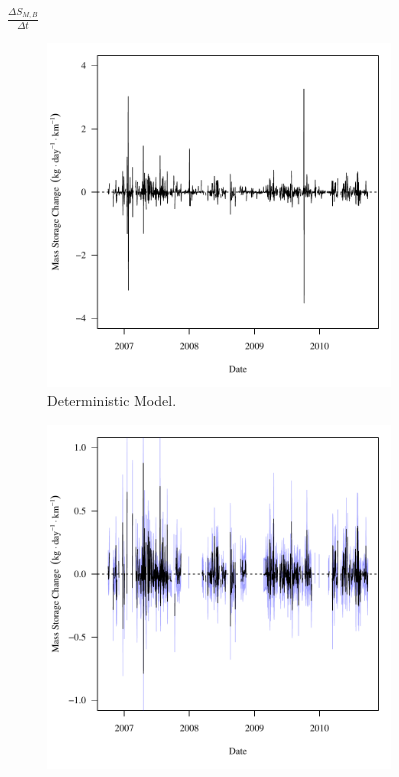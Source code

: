 \subfiguremid
\begin{landscape}
	\begin{figure}
		$ \displaystyle \frac{\Delta S_{M,B}}{\Delta t} $
		\begin{subfigure}{0.7\textwidth}
			\centering
			\includegraphics[width=\tableCustomSize]{"Figures/Results_USR/Deterministic/f Segment B"}
			\caption{Deterministic Model.}
		\end{subfigure}%
		\begin{subfigure}{0.7\textwidth}
			\centering
			\includegraphics[width=\tableCustomSize]{"Figures/Results_USR/Stochastic/f Segment B"}

\end{subfigure}
\end{figure}
\end{landscape}
